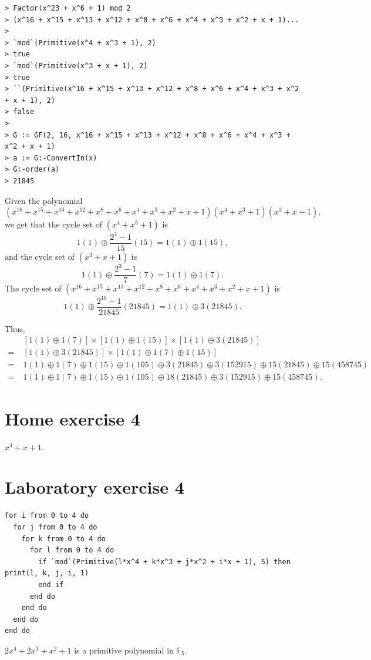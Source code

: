\documentclass{article}
\theoremstyle{definition}
\theoremstyle{definition}
\theoremstyle{definition}
\begin{document}
\begin{verbatim}
> Factor(x^23 + x^6 + 1) mod 2
> (x^16 + x^15 + x^13 + x^12 + x^8 + x^6 + x^4 + x^3 + x^2 + x + 1)...
>
> `mod`(Primitive(x^4 + x^3 + 1), 2)
> true
> `mod`(Primitive(x^3 + x + 1), 2)
> true
> ``(Primitive(x^16 + x^15 + x^13 + x^12 + x^8 + x^6 + x^4 + x^3 + x^2 + x + 1), 2)
> false
>
> G := GF(2, 16, x^16 + x^15 + x^13 + x^12 + x^8 + x^6 + x^4 + x^3 + x^2 + x + 1)
> a := G:-ConvertIn(x)
> G:-order(a)
> 21845
\end{verbatim}
Given the polynomial
$$(x^{16}+x^{15}+x^{13}+x^{12}+x^8+x^6+x^4+x^3+x^2+x+1)(x^4+x^3+1)(x^3+x+1),$$
we get that the cycle set of $(x^4 + x^3 + 1)$ is
$$1(1) \oplus \frac{2^4 - 1}{15}(15) = 1(1) \oplus 1(15),$$
and the cycle set of $(x^3 + x + 1)$ is
$$1(1) \oplus \frac{2^3 - 1}{7}(7) = 1(1) \oplus 1(7).$$
The cycle set of $(x^{16}+x^{15}+x^{13}+x^{12}+x^8+x^6+x^4+x^3+x^2+x+1)$ is
$$1(1) \oplus \frac{2^16 - 1}{21845}(21845) = 1(1) \oplus 3(21845).$$

Thus,
\begin{align*}
&\;[1(1) \oplus 1(7)] \times
[1(1) \oplus 1(15)] \times
[1(1) \oplus 3(21845)] \\
=&\;[1(1) \oplus 3(21845)] \times [1(1) \oplus 1(7) \oplus 1(15)] \\
=&\;1(1)\oplus1(7)\oplus1(15)\oplus1(105)\oplus3(21845)\oplus3(152915)\oplus15(21845)\oplus15(458745) \\
=&\;1(1)\oplus1(7)\oplus1(15)\oplus1(105)\oplus18(21845)\oplus3(152915)\oplus15(458745).
\end{align*}

\section{Home exercise 4}
$x^4 + x + 1$.

\section{Laboratory exercise 4}
\begin{verbatim}
for i from 0 to 4 do
  for j from 0 to 4 do
    for k from 0 to 4 do
      for l from 0 to 4 do
        if `mod`(Primitive(l*x^4 + k*x^3 + j*x^2 + i*x + 1), 5) then print(l, k, j, i, 1)
        end if
      end do
    end do
  end do
end do
\end{verbatim}
$2x^4 + 2x^3 + x^2 + 1$ is a primitive polynomial in $\mathbb{F}_5$.
\end{document}
